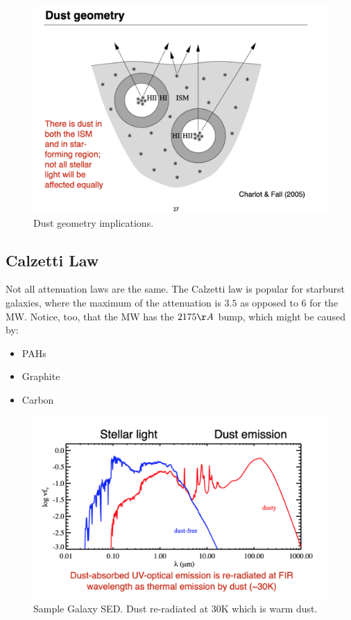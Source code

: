 \documentclass{article}
\begin{document}
\begin{figure}
    \centering
    \includegraphics{figs/Screen Shot 2021-09-17 at 9.23.43 AM.png}
    \caption{Dust geometry implications.}
    \label{fig:dust}
\end{figure}

\subsection{Calzetti Law}

Not all attenuation laws are the same. The Calzetti law is popular for starburst galaxies, where the maximum of the attenuation is $3.5$ as opposed to $6$ for the MW. Notice, too, that the MW has the $2175\AA$ bump, which might be caused by:
\begin{itemize}
    \item PAHs
    \item Graphite
    \item Carbon
\end{itemize}

\begin{figure}
    \centering
    \includegraphics{figs/Screen Shot 2021-09-17 at 9.23.09 AM.png}
    \caption{Sample Galaxy SED. Dust re-radiated at 30K which is warm dust. }
    \label{fig:sedDDD}
\end{figure}
\end{document}
